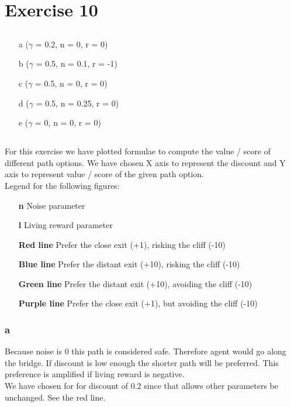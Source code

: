 \section{Exercise 10}
\subsection{}
\begin{itemize}
  \item [a] ($\gamma$ = 0.2, n = 0, r = 0)
  \item [b] ($\gamma$ = 0.5, n = 0.1, r = -1)
  \item [c] ($\gamma$ = 0.5, n = 0, r = 0)
  \item [d] ($\gamma$ = 0.5, n = 0.25, r = 0)
  \item [e] ($\gamma$ = 0, n = 0, r = 0)
\end{itemize}

\subsection{}
For this exercise we have plotted formulae to compute the value / score of different path options. We have chosen X axis to represent the discount and Y axis to represent value / score of the given path option. \\ \smallskip
Legend for the following figures:
\begin{itemize}
  \item [\textbf{n}] Noise parameter
  \item [\textbf{l}] Living reward parameter
  \item [\textbf{Red line}] Prefer the close exit (+1), risking the cliff (-10)
  \item [\textbf{Blue line}] Prefer the distant exit (+10), risking the cliff (-10)
  \item [\textbf{Green line}] Prefer the distant exit (+10), avoiding the cliff (-10)
  \item [\textbf{Purple line}] Prefer the close exit (+1), but avoiding the cliff (-10)
\end{itemize}


\subsubsection{a}
Because noise is 0 this path is considered safe. Therefore agent would go along the bridge. If discount is low enough the shorter path will be preferred. This preference is amplified if living reward is negative. \\ 
We have chosen for for discount of 0.2 since that allows other parameters be unchanged. See  the red line.

